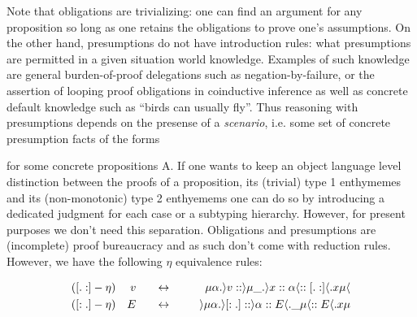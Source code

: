 \documentclass{article}
\begin{document}
Note that obligations are trivializing: one can find an argument for any proposition so long as one retains the obligations to prove one's assumptions.
On the other hand, presumptions do not have introduction rules: what presumptions are permitted in a given situation world knowledge. Examples of such knowledge are general burden-of-proof delegations such as negation-by-failure, or the assertion of looping proof obligations in coinductive inference as well as concrete default knowledge such as ``birds can usually fly''.
Thus reasoning with presumptions depends on the presense of a \emph{scenario}, i.e. some set of concrete presumption facts of the forms

\begin{center}
  \begin{minipage}{0.48\linewidth}
    \begin{prooftree}
      \label{rule:termenth}
    \end{prooftree}
  \end{minipage}

  \begin{minipage}{0.48\linewidth}
    \begin{prooftree}
      \label{rule:contextenth}
    \end{prooftree}
  \end{minipage}
\end{center}

for some concrete propositions A.
If one wants to keep an object language level distinction between the proofs of a proposition, its (trivial) type 1 enthymemes and its (non-monotonic) type 2 enthyemems one can do so by introducing a dedicated judgment for each case or a subtyping hierarchy.
However, for present purposes we don't need this separation.
Obligations and presumptions are (incomplete) proof bureaucracy and as such don't come with reduction rules.
However, we have the following $\eta$ equivalence rules:

\begin{align*}
  ([.:]-\eta&) & v &\mathrel{\mkern30mu\leftrightarrow\mkern30mu} & \mu \alpha.\rangle v  :: \rangle \mu\_.\rangle x :: \alpha \langle::[.:]\langle .x\mu \langle \\
  ([:.]-\eta&) & E &\mathrel{\mkern30mu\leftrightarrow\mkern30mu} & \rangle \mu \alpha.\rangle [:.] :: \rangle \alpha :: E\langle.\_\mu\langle :: E \langle .x\mu
\end{align*}
\end{document}
